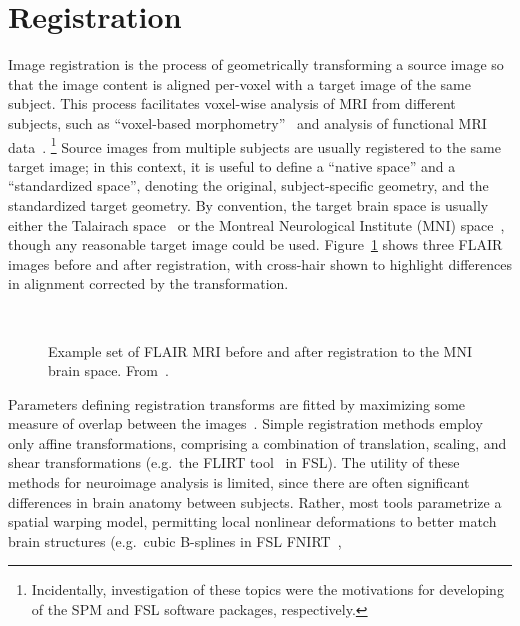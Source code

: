 \section{Registration}\label{s:pre-reg}
Image registration is the process of geometrically transforming a source image
so that the image content is aligned per-voxel with a target image of the same subject.
This process facilitates voxel-wise analysis of MRI from different subjects,
such as  ``voxel-based morphometry''~\cite{Ashburner2000a}
and analysis of functional MRI data~\cite{Smith2004}.%
\footnote{Incidentally, investigation of these topics were the motivations
  for developing of the SPM and FSL software packages, respectively.}
Source images from multiple subjects are usually registered to the same target image; 
in this context, it is useful to define a ``native space'' and a ``standardized space'',
denoting the original, subject-specific geometry, and the standardized target geometry.
By convention, the target brain space is usually either
the Talairach space~\cite{Talairach1988} or
the Montreal Neurological Institute (MNI) space~\cite{Evans1993},
though any reasonable target image could be used.
Figure~\ref{fig:pre-registration} shows three FLAIR images before and after registration,
with cross-hair shown to highlight differences in alignment corrected by the transformation.
\par
\begin{figure}
  \centering
  \\[0.5em]
  \caption{Example set of FLAIR MRI before and after registration to the MNI brain space.
    From~\cite{WMHSEG2017}.}%
  \label{fig:pre-registration}
\end{figure}
Parameters defining registration transforms are fitted by
maximizing some measure of overlap between the images~\cite{Sotiras2013}.
Simple registration methods employ only affine transformations,
comprising a combination of translation, scaling, and shear transformations
(e.g.\ the FLIRT tool~\cite{Jenkinson2002} in FSL).
The utility of these methods for neuroimage analysis is limited,
since there are often significant differences in brain anatomy between subjects.
Rather, most tools parametrize a spatial warping model,
permitting local nonlinear deformations to better match brain structures (e.g.\ 
cubic B-splines in FSL FNIRT~\cite{Andersson2007},
